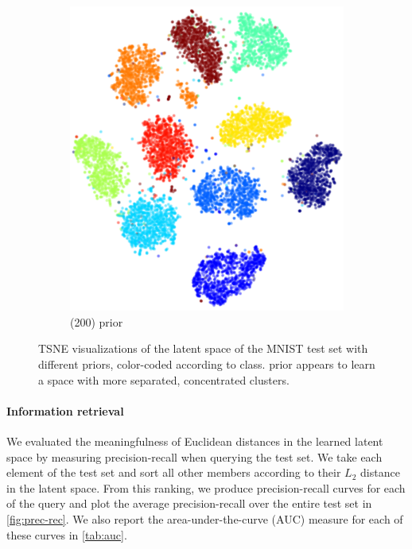 \begin{figure}[H]
\begin{subfigure}[t]{0.2\textwidth}
    \includegraphics[width=\textwidth]{img/loracs/mnist/tsne/mnist2-tsne-tmc.png}
    \caption{\acronym(200) prior}
\end{subfigure}
\caption{TSNE visualizations of the latent space of the MNIST test set with different priors,
color-coded according to class. \acronym\;prior appears to learn a space with more
separated, concentrated clusters.}
\label{fig:tsne-tmc-normal}
\end{figure}

\paragraph{Information retrieval}
We evaluated the meaningfulness of Euclidean distances
in the learned latent space
by measuring precision-recall
when querying the test set.
We take each element of the test set
and sort all other members according to
their $L_2$ distance in the latent space.
From this ranking, we produce
precision-recall curves for each 
of the query and 
plot the average precision-recall
over the entire test set in \autoref{fig:prec-rec}.
We also report the area-under-the-curve (AUC)
measure for each of these curves in \autoref{tab:auc}.

